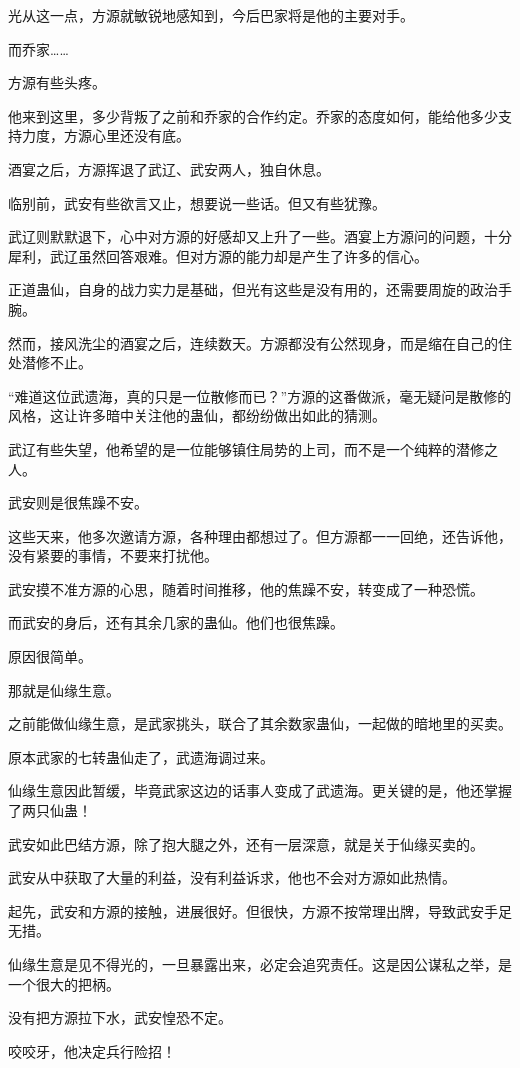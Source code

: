 \begin{this_body}
光从这一点，方源就敏锐地感知到，今后巴家将是他的主要对手。

而乔家……

方源有些头疼。

他来到这里，多少背叛了之前和乔家的合作约定。乔家的态度如何，能给他多少支持力度，方源心里还没有底。

酒宴之后，方源挥退了武辽、武安两人，独自休息。

临别前，武安有些欲言又止，想要说一些话。但又有些犹豫。

武辽则默默退下，心中对方源的好感却又上升了一些。酒宴上方源问的问题，十分犀利，武辽虽然回答艰难。但对方源的能力却是产生了许多的信心。

正道蛊仙，自身的战力实力是基础，但光有这些是没有用的，还需要周旋的政治手腕。

然而，接风洗尘的酒宴之后，连续数天。方源都没有公然现身，而是缩在自己的住处潜修不止。

“难道这位武遗海，真的只是一位散修而已？”方源的这番做派，毫无疑问是散修的风格，这让许多暗中关注他的蛊仙，都纷纷做出如此的猜测。

武辽有些失望，他希望的是一位能够镇住局势的上司，而不是一个纯粹的潜修之人。

武安则是很焦躁不安。

这些天来，他多次邀请方源，各种理由都想过了。但方源都一一回绝，还告诉他，没有紧要的事情，不要来打扰他。

武安摸不准方源的心思，随着时间推移，他的焦躁不安，转变成了一种恐慌。

而武安的身后，还有其余几家的蛊仙。他们也很焦躁。

原因很简单。

那就是仙缘生意。

之前能做仙缘生意，是武家挑头，联合了其余数家蛊仙，一起做的暗地里的买卖。

原本武家的七转蛊仙走了，武遗海调过来。

仙缘生意因此暂缓，毕竟武家这边的话事人变成了武遗海。更关键的是，他还掌握了两只仙蛊！

武安如此巴结方源，除了抱大腿之外，还有一层深意，就是关于仙缘买卖的。

武安从中获取了大量的利益，没有利益诉求，他也不会对方源如此热情。

起先，武安和方源的接触，进展很好。但很快，方源不按常理出牌，导致武安手足无措。

仙缘生意是见不得光的，一旦暴露出来，必定会追究责任。这是因公谋私之举，是一个很大的把柄。

没有把方源拉下水，武安惶恐不定。

咬咬牙，他决定兵行险招！

\end{this_body}

